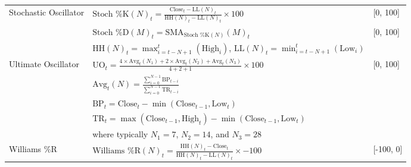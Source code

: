 \begin{table}[htb!]
\begin{tabularx}{\textwidth}{@{}lXl@{}}
\addlinespace
Stochastic Oscillator & $\text{Stoch \%K}(N)_t = \frac{\text{Close}_t - \text{LL}(N)_t}{\text{HH}(N)_t - \text{LL}(N)_t} \times 100$ & [0, 100] \\
\addlinespace
& $\text{Stoch \%D}(M)_t = \text{SMA}_{\text{Stoch \%K}(N)}(M)_t$ & [0, 100] \\
\addlinespace
& $\text{HH}(N)_t = \max_{i=t-N+1}^{t}(\text{High}_i)$, $\text{LL}(N)_t = \min_{i=t-N+1}^{t}(\text{Low}_i)$ & \\
\addlinespace
Ultimate Oscillator & $\text{UO}_t = \frac{4 \times \text{Avg}_t(N_1) + 2 \times \text{Avg}_t(N_2) + \text{Avg}_t(N_3)}{4+2+1} \times 100$ & [0, 100] \\
\addlinespace
& $\text{Avg}_t(N) = \frac{\sum_{i=0}^{N-1}\text{BP}_{t-i}}{\sum_{i=0}^{N-1}\text{TR}_{t-i}}$ & \\
\addlinespace
& $\text{BP}_t = \text{Close}_t - \min(\text{Close}_{t-1}, \text{Low}_t)$ & \\
\addlinespace
& $\text{TR}_t = \max(\text{Close}_{t-1}, \text{High}_t) - \min(\text{Close}_{t-1}, \text{Low}_t)$ & \\
\addlinespace
& where typically $N_1 = 7$, $N_2 = 14$, and $N_3 = 28$ & \\
\addlinespace
Williams \%R & $\text{Williams \%R}(N)_t = \frac{\text{HH}(N)_t - \text{Close}_t}{\text{HH}(N)_t - \text{LL}(N)_t} \times -100$ & [-100, 0] \\
\bottomrule
\end{tabularx}
\end{table}
